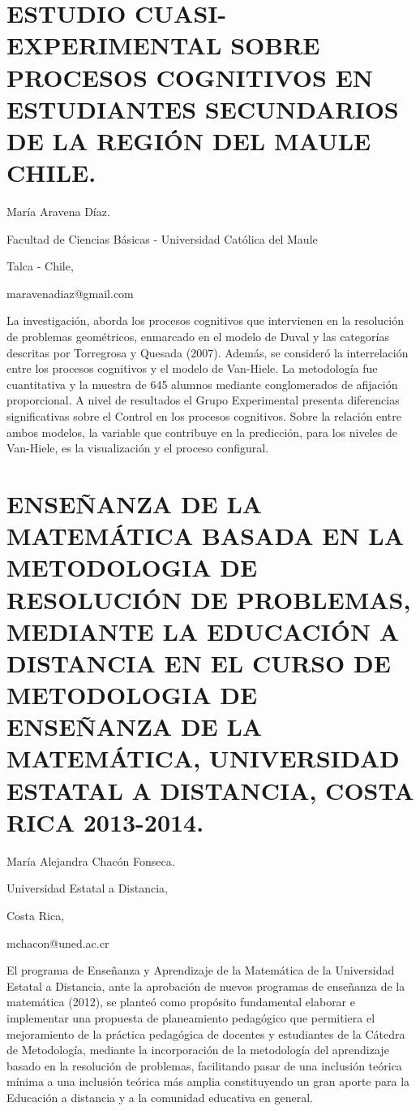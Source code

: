 \section{ESTUDIO CUASI-EXPERIMENTAL SOBRE PROCESOS COGNITIVOS EN ESTUDIANTES
SECUNDARIOS DE LA REGIÓN DEL MAULE CHILE.}

\begin{datos}

María Aravena Díaz.

Facultad de Ciencias Básicas - Universidad Católica del Maule

Talca - Chile,

maravenadiaz@gmail.com 

\end{datos}

La investigación, aborda los procesos cognitivos que intervienen en
la resolución de problemas geométricos, enmarcado en el modelo de
Duval y las categorías descritas por Torregrosa y Quesada (2007).
Además, se consideró la interrelación entre los procesos cognitivos
y el modelo de Van-Hiele. La metodología fue cuantitativa y la muestra
de 645 alumnos mediante conglomerados de afijación proporcional. A
nivel de resultados el Grupo Experimental presenta diferencias significativas
sobre el Control en los procesos cognitivos. Sobre la relación entre
ambos modelos, la variable que contribuye en la predicción, para los
niveles de Van-Hiele, es la visualización y el proceso configural. 


\section{ENSEÑANZA DE LA MATEMÁTICA BASADA EN LA METODOLOGIA DE RESOLUCIÓN
DE PROBLEMAS, MEDIANTE LA EDUCACIÓN A DISTANCIA EN EL CURSO DE METODOLOGIA
DE ENSEÑANZA DE LA MATEMÁTICA, UNIVERSIDAD ESTATAL A DISTANCIA, COSTA
RICA 2013-2014.}

\begin{datos}

María Alejandra Chacón Fonseca. 

Universidad Estatal a Distancia,

Costa Rica,

mchacon@uned.ac.cr 

\end{datos}

El programa de Enseñanza y Aprendizaje de la Matemática de la Universidad
Estatal a Distancia, ante la aprobación de nuevos programas de enseñanza
de la matemática (2012), se planteó como propósito fundamental elaborar
e implementar una propuesta de planeamiento pedagógico que permitiera
el mejoramiento de la práctica pedagógica de docentes y estudiantes
de la Cátedra de Metodología, mediante la incorporación de la metodología
del aprendizaje basado en la resolución de problemas, facilitando
pasar de una inclusión teórica mínima a una inclusión teórica más
amplia constituyendo un gran aporte para la Educación a distancia
y a la comunidad educativa en general.


